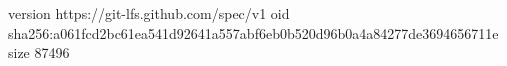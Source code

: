 version https://git-lfs.github.com/spec/v1
oid sha256:a061fcd2bc61ea541d92641a557abf6eb0b520d96b0a4a84277de3694656711e
size 87496
